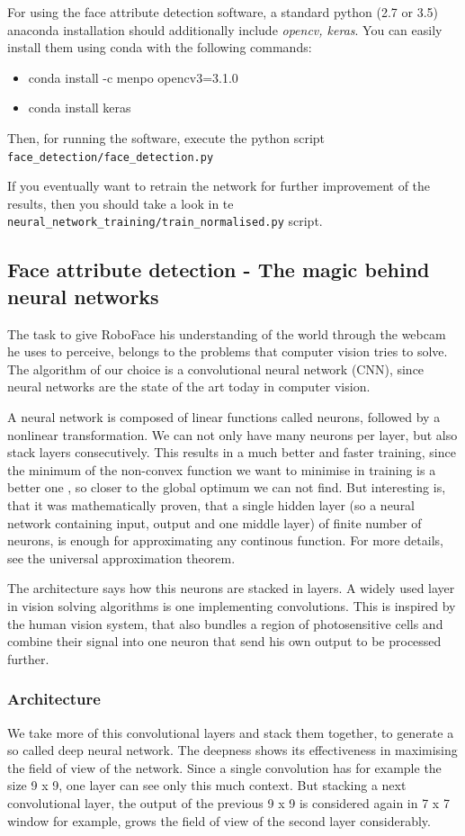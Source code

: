 \documentclass[12.5pt]{scrartcl}
\begin{document}
	
	For using the face attribute detection software, a standard python (2.7 or 3.5) anaconda installation should additionally include \textit{opencv, keras}. You can easily install them using conda with the following commands:
	\begin{itemize}
	\item conda install -c menpo opencv3=3.1.0
	\item conda install keras
	\end{itemize}
	Then, for running the software, execute the python script \texttt{face\_detection/face\_detection.py}
	
	If you eventually want to retrain the network for further improvement of the results, then you should take a look in te \texttt{neural\_network\_training/train\_normalised.py} script.
	\subsection{Face attribute detection - The magic behind neural networks}
	The task to give RoboFace his understanding of the world through the webcam he uses to perceive, belongs to the problems that computer vision tries to solve. The algorithm of our choice is a convolutional neural network (CNN), since neural networks are the state of the art today in computer vision.
	
	A neural network is composed of linear functions called neurons, followed by a nonlinear transformation. We can not only have many neurons per layer, but also stack layers consecutively. This results in a much better and faster training, since the minimum of the non-convex function we want to minimise in training is a better one , so closer to the global optimum we can not find. But interesting is, that it was mathematically proven, that a single hidden layer (so a neural network containing input, output and one middle layer) of finite number of neurons, is enough for approximating any continous function. For more details, see the universal approximation theorem.
	
	
	The architecture says how this neurons are stacked in layers. A widely used layer in vision solving algorithms is one implementing convolutions. This is inspired by the human vision system, that also bundles a region of photosensitive cells and combine their signal into one neuron that send his own output to be processed further.
	
	\subsubsection{Architecture}
	We take more of this convolutional layers and stack them together, to generate a so called deep neural network. The deepness shows its effectiveness in maximising the field of view of the network. Since a single convolution has for example the size 9 x 9, one layer can see only this much context. But stacking a next convolutional layer, the output of the previous 9 x 9 is considered again in 7 x 7 window for example, grows the field of view of the second layer considerably.
	
\end{document}
